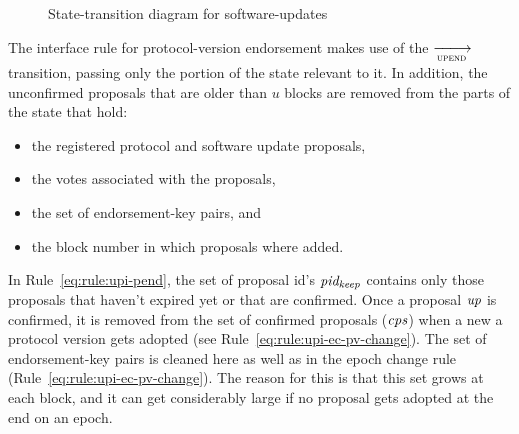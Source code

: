 \begin{figure}[ht]
  \centering

  \caption{State-transition diagram for software-updates}
  \label{fig:st-diagram-sw-up}
\end{figure}

\clearpage

The interface rule for protocol-version endorsement makes use of the
$\trans{upend}{}$ transition, passing only the portion of the state relevant
to it. In addition, the unconfirmed proposals that are older than $u$ blocks
are removed from the parts of the state that hold:
\begin{itemize}
\item the registered protocol and software update proposals,
\item the votes associated with the proposals,
\item the set of endorsement-key pairs, and
\item the block number in which proposals where added.
\end{itemize}

In Rule~\ref{eq:rule:upi-pend}, the set of proposal id's $\mathit{pid_{keep}}$
contains only those proposals that haven't expired yet or that are confirmed.
Once a proposal $\mathit{up}$ is confirmed, it is removed from the set of
confirmed proposals ($\mathit{cps}$) when a new a protocol version gets adopted
(see Rule~\ref{eq:rule:upi-ec-pv-change}).
%
The set of endorsement-key pairs is cleaned here as well as in the epoch change
rule (Rule~\ref{eq:rule:upi-ec-pv-change}). The reason for this is that this set grows at
each block, and it can get considerably large if no proposal gets adopted at
the end on an epoch.

